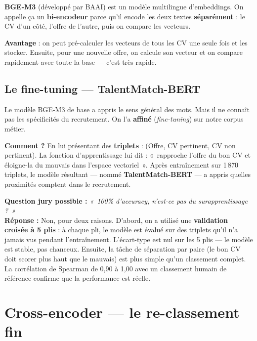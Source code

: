 \documentclass[12pt,a4paper]{article}
\newenvironment{jury}{%
  \def\FrameCommand{\fboxsep=8pt\colorbox{orange!12}}%
  \MakeFramed{\advance\hsize-\width \FrameRestore}%
  \vspace{-4pt}%
}{\endMakeFramed}
\newcommand{\concept}[1]{\textbf{\color{bleu}#1}}
\begin{document}
\concept{BGE-M3} (développé par BAAI) est un modèle multilingue d'embeddings. On appelle ça un \concept{bi-encodeur} parce qu'il encode les deux textes \textbf{séparément} : le CV d'un côté, l'offre de l'autre, puis on compare les vecteurs.

\textbf{Avantage} : on peut pré-calculer les vecteurs de tous les CV une seule fois et les stocker. Ensuite, pour une nouvelle offre, on calcule son vecteur et on compare rapidement avec toute la base — c'est très rapide.

\subsection{Le fine-tuning — TalentMatch-BERT}

Le modèle BGE-M3 de base a appris le sens général des mots. Mais il ne connaît pas les spécificités du recrutement. On l'a \concept{affiné} (\textit{fine-tuning}) sur notre corpus métier.

\textbf{Comment ?} En lui présentant des \concept{triplets} : (Offre, CV pertinent, CV non pertinent). La fonction d'apprentissage lui dit : «~rapproche l'offre du bon CV et éloigne-la du mauvais dans l'espace vectoriel~». Après entraînement sur 1\,870 triplets, le modèle résultant --- nommé \textbf{TalentMatch-BERT} --- a appris quelles proximités comptent dans le recrutement.

\begin{jury}
\textbf{Question jury possible :} \textit{«~100\% d'accuracy, n'est-ce pas du surapprentissage ?~»}\\[4pt]
\textbf{Réponse :} Non, pour deux raisons. D'abord, on a utilisé une \textbf{validation croisée à 5 plis} : à chaque pli, le modèle est évalué sur des triplets qu'il n'a jamais vus pendant l'entraînement. L'écart-type est nul sur les 5 plis — le modèle est stable, pas chanceux. Ensuite, la tâche de séparation par paire (le bon CV doit scorer plus haut que le mauvais) est plus simple qu'un classement complet. La corrélation de Spearman de 0,90 à 1,00 avec un classement humain de référence confirme que la performance est réelle.
\end{jury}

\newpage

\section{Cross-encoder — le re-classement fin}
\end{document}

